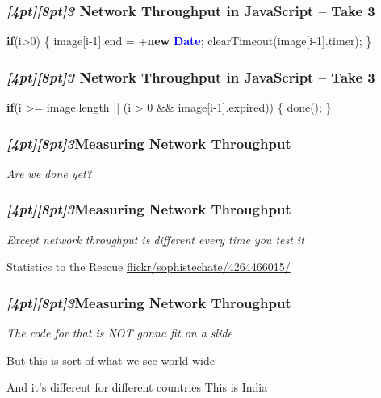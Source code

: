 \documentclass{beamer}
\newcommand{\sn}[1]{\textrm{\textit{\Huge{\raisebox{-3pt}[4pt][8pt]{\textcolor{f2elblue}{#1}}}}}\hspace{4pt}}
\newcommand{\innersplash}[1]{
  \begin{center}
    \large \textrm{\textit{ #1 } }
  \end{center}
}
\newcommand{\splashslide}[2][{}]{
  \begin{frame}
  \frametitle{#1}
  \innersplash{#2}
  \end{frame}
}
\def\green<#1>#2{\textcolor<#1>{dark-green}{\textbf<#1>{#2}}}
\def\blue<#1>#2{\textcolor<#1>{blue}{\textbf<#1>{#2}}}
\begin{document}
\begin{frame}[fragile]
\frametitle{\sn{3} Network Throughput in JavaScript -- Take 3}
\begin{semiverbatim}
\green<1>{if}(i>0) \{
   image[i-1].end = +\green<1>{new} \blue<1>{Date};
   clearTimeout(image[i-1].timer);
\}
\end{semiverbatim}
\end{frame}

\begin{frame}[fragile]
\frametitle{\sn{3} Network Throughput in JavaScript -- Take 3}
\begin{semiverbatim}
\green<1>{if}(i >= image.length
      || (i > 0 \&\& image[i-1].expired)) \{
   done();
\}
\end{semiverbatim}
\end{frame}

\splashslide[\sn{3}Measuring Network Throughput]{Are we done yet?\\ \only<2->{sure...}}

\splashslide[\sn{3}Measuring Network Throughput]{Except network throughput is different every time you test it}

\begin{frame}{Statistics to the Rescue}
\vspace{7.8cm}
\hspace{-1cm} \tiny \href{http://www.flickr.com/photos/sophistechate/4264466015/}{flickr/sophistechate/4264466015/}
\end{frame}

\splashslide[\sn{3}Measuring Network Throughput]{The code for that is NOT gonna fit on a slide}

\begin{frame}{But this is sort of what we see world-wide}
\end{frame}

\begin{frame}{And it's different for different countries}
\vspace{6em}
This is India
\end{frame}
\end{document}
